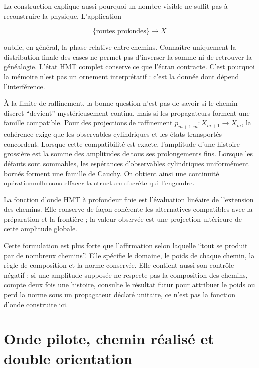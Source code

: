 La construction explique aussi pourquoi un nombre visible ne suffit pas à reconstruire
la physique. L'application

\[
  \{\text{routes profondes}\}\longrightarrow X
\]

oublie, en général, la phase relative entre chemins. Connaître uniquement la
distribution finale des cases ne permet pas d'inverser la somme ni de retrouver la
généalogie. L'état HMT complet conserve ce que l'écran contracte. C'est pourquoi la
mémoire n'est pas un ornement interprétatif : c'est la donnée dont dépend l'interférence.

À la limite de raffinement, la bonne question n'est pas de savoir si le chemin discret
``devient'' mystérieusement continu, mais si les propagateurs forment une famille
compatible. Pour des projections de raffinement \(p_{m+1,m}:X_{m+1}\to X_m\), la
cohérence exige que les observables cylindriques et les états transportés
concordent. Lorsque cette compatibilité est exacte, l'amplitude d'une histoire grossière
est la somme des amplitudes de tous ses prolongements fins. Lorsque les défauts
sont sommables, les espérances d'observables cylindriques uniformément bornés
forment une famille de Cauchy. On obtient ainsi une continuité opérationnelle sans effacer la
structure discrète qui l'engendre.

\begin{principle}
La fonction d'onde HMT à profondeur finie est l'évaluation linéaire de l'extension
des chemins. Elle conserve de façon cohérente les alternatives compatibles avec la
préparation et la frontière ; la valeur observée est une projection ultérieure de cette
amplitude globale.
\end{principle}

Cette formulation est plus forte que l'affirmation selon laquelle ``tout se produit par de nombreux chemins''.
Elle spécifie le domaine, le poids de chaque chemin, la règle de composition et la norme
conservée. Elle contient aussi son contrôle négatif : si une amplitude supposée ne
respecte pas la composition des chemins, compte deux fois une histoire, consulte le
résultat futur pour attribuer le poids ou perd la norme sous un propagateur
déclaré unitaire, ce n'est pas la fonction d'onde construite ici.

\section{Onde pilote, chemin réalisé et double orientation}

